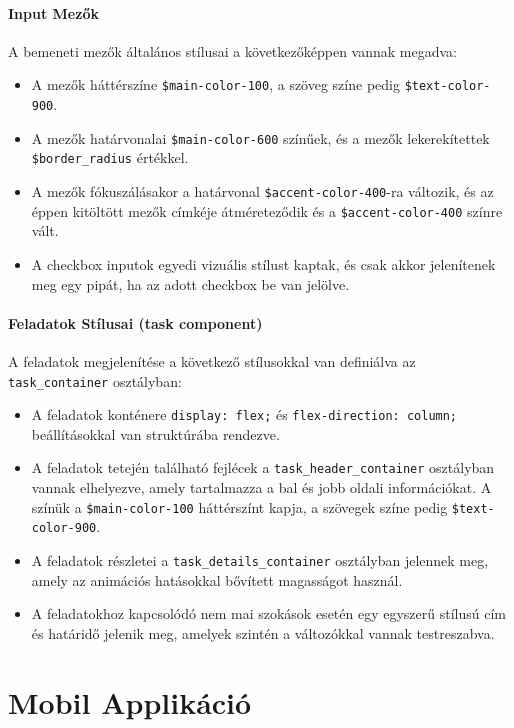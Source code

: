 \documentclass[12pt]{report}
\begin{document}
\subsubsection{Input Mezők}
A bemeneti mezők általános stílusai a következőképpen vannak megadva:

\begin{itemize}
    \item A mezők háttérszíne \texttt{\$main-color-100}, a szöveg színe pedig \texttt{\$text-color-900}.
    \item A mezők határvonalai \texttt{\$main-color-600} színűek, és a mezők lekerekítettek \texttt{\$border\_radius} értékkel.
    \item A mezők fókuszálásakor a határvonal \texttt{\$accent-color-400}-ra változik, és az éppen kitöltött mezők címkéje átméreteződik és a \texttt{\$accent-color-400} színre vált.
    \item A checkbox inputok egyedi vizuális stílust kaptak, és csak akkor jelenítenek meg egy pipát, ha az adott checkbox be van jelölve.
\end{itemize}

\subsubsection{Feladatok Stílusai (task component)}
A feladatok megjelenítése a következő stílusokkal van definiálva az \texttt{task\_container} osztályban:

\begin{itemize}
    \item A feladatok konténere \texttt{display: flex;} és \texttt{flex-direction: column;} beállításokkal van struktúrába rendezve.
    \item A feladatok tetején található fejlécek a \texttt{task\_header\_container} osztályban vannak elhelyezve, amely tartalmazza a bal és jobb oldali információkat. A színük a \texttt{\$main-color-100} háttérszínt kapja, a szövegek színe pedig \texttt{\$text-color-900}.
    \item A feladatok részletei a \texttt{task\_details\_container} osztályban jelennek meg, amely az animációs hatásokkal bővített magasságot használ.
    \item A feladatokhoz kapcsolódó nem mai szokások esetén egy egyszerű stílusú cím és határidő jelenik meg, amelyek szintén a változókkal vannak testreszabva.
\end{itemize}


\chapter{Mobil Applikáció}
\end{document}
